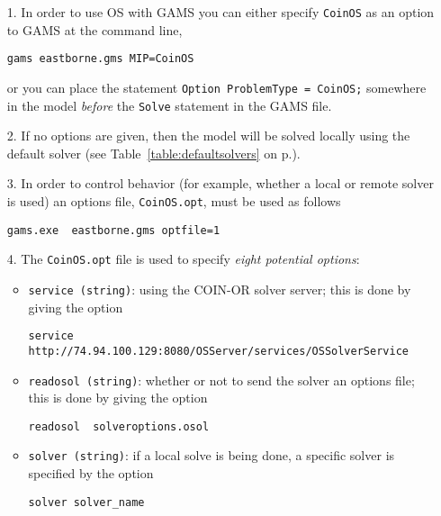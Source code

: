 \fi

\label{section:gamssummary}


\begin{enumerate}

\item[1.]   In order to use OS with GAMS you can either specify {\tt CoinOS} as an option to GAMS 
at the command line,
\begin{verbatim}
gams eastborne.gms MIP=CoinOS
\end{verbatim}
or you can  place the statement {\tt Option ProblemType = CoinOS;} somewhere in the model {\it before} 
the {\tt Solve} statement in the GAMS file.


\item[2.]   If no options are given, then the model will be solved locally using the default solver 
(see Table~\ref{table:defaultsolvers} on p.\pageref{table:defaultsolvers}).

\item[3.] In order to control behavior (for example, whether a local or remote solver is used)  an options
 file,  {\tt CoinOS.opt}, must be used as follows

\begin{verbatim}
gams.exe  eastborne.gms optfile=1
\end{verbatim}

\item[4.]  The  {\tt CoinOS.opt} file is used to specify {\it eight potential options}:


\begin{itemize}
\item {\tt service (string)}: using the COIN-OR solver server; this is done by giving the option

\begin{verbatim}
service  http://74.94.100.129:8080/OSServer/services/OSSolverService
\end{verbatim}


\item  {\tt readosol (string)}: whether or not to send the solver an options file; this is done by 
giving the option
\begin{verbatim}
readosol  solveroptions.osol
\end{verbatim}


\item   {\tt solver (string)}: if a local solve is being done,  a specific solver is specified by 
the option
\begin{verbatim}
solver solver_name
\end{verbatim}


\end{itemize}
\end{enumerate}
